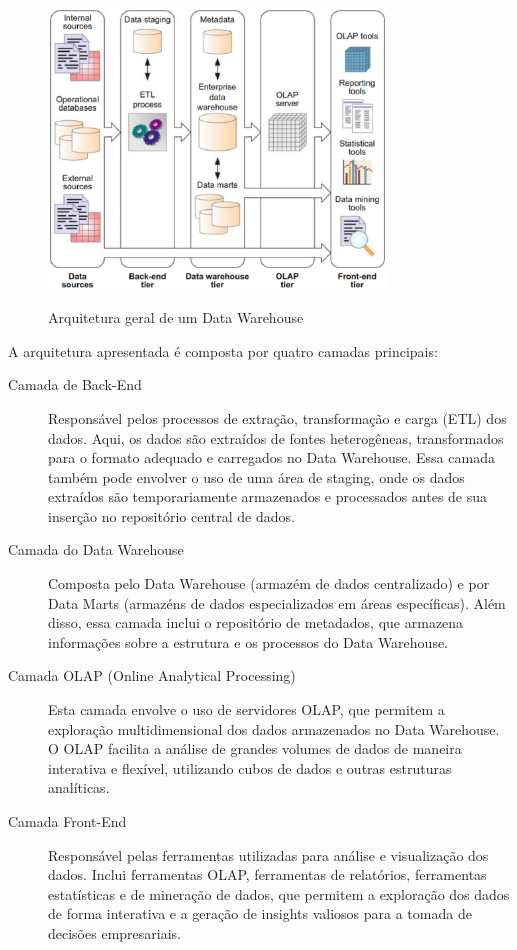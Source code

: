 \begin{figure}[h]
    \centering
    \includegraphics[width=0.8\textwidth]{figuras/typical_data_warehouse_architecture.eps}
    \caption{Arquitetura geral de um Data Warehouse}
    \cite{vaisman2014data}
    \label{fig:arquitetura_dw}
\end{figure} 

A arquitetura apresentada é composta por quatro camadas principais:
\begin{description}
    \item[Camada de Back-End] Responsável pelos processos de extração, transformação e carga (ETL) dos dados. Aqui, os dados são extraídos 
    de fontes heterogêneas, transformados para o formato adequado e carregados no Data Warehouse. Essa camada também pode envolver o uso de 
    uma área de staging, onde os dados extraídos são temporariamente armazenados e processados antes de sua inserção no repositório central 
    de dados.
    \item[Camada do Data Warehouse] Composta pelo Data Warehouse (armazém de dados centralizado) e por Data Marts (armazéns de dados 
    especializados em áreas específicas). Além disso, essa camada inclui o repositório de metadados, que armazena informações sobre 
    a estrutura e os processos do Data Warehouse.
    \item[Camada OLAP (Online Analytical Processing)] Esta camada envolve o uso de servidores OLAP, que permitem a exploração multidimensional 
    dos dados armazenados no Data Warehouse. O OLAP facilita a análise de grandes volumes de dados de maneira interativa e flexível, utilizando 
    cubos de dados e outras estruturas analíticas.
    \item[Camada Front-End] Responsável pelas ferramentas utilizadas para análise e visualização dos dados. Inclui ferramentas OLAP, ferramentas 
    de relatórios, ferramentas estatísticas e de mineração de dados, que permitem a exploração dos dados de forma interativa e a geração de 
    insights valiosos para a tomada de decisões empresariais.
\end{description}

